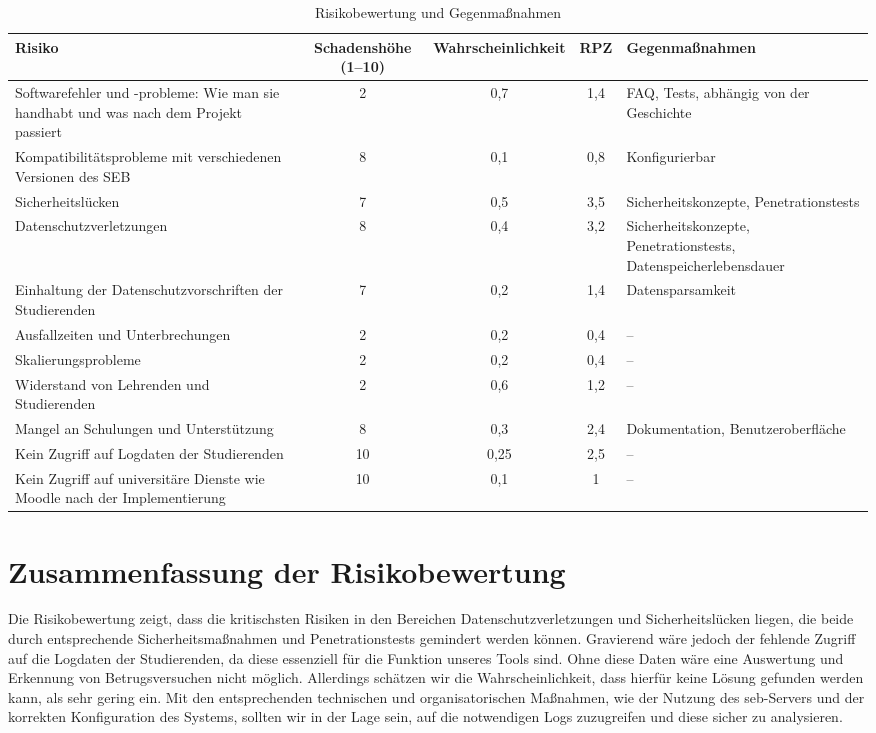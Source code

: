 \begin{landscape}
\begin{table}[htbp]
\centering
\begin{tabular}{|p{7cm}|c|c|c|p{6cm}|}
\hline
\textbf{Risiko} & \textbf{Schadenshöhe (1–10)} & \textbf{Wahrscheinlichkeit} & \textbf{RPZ} & \textbf{Gegenmaßnahmen} \\
\hline
Softwarefehler und -probleme: Wie man sie handhabt und was nach dem Projekt passiert & 2 & 0,7 & 1,4 & FAQ, Tests, abhängig von der Geschichte \\
\hline
Kompatibilitätsprobleme mit verschiedenen Versionen des SEB & 8 & 0,1 & 0,8 & Konfigurierbar \\
\hline
Sicherheitslücken & 7 & 0,5 & 3,5 & Sicherheitskonzepte, Penetrationstests \\
\hline
Datenschutzverletzungen & 8 & 0,4 & 3,2 & Sicherheitskonzepte, Penetrationstests, Datenspeicherlebensdauer \\
\hline
Einhaltung der Datenschutzvorschriften der Studierenden & 7 & 0,2 & 1,4 & Datensparsamkeit \\
\hline
Ausfallzeiten und Unterbrechungen & 2 & 0,2 & 0,4 & -- \\
\hline
Skalierungsprobleme & 2 & 0,2 & 0,4 & -- \\
\hline
Widerstand von Lehrenden und Studierenden & 2 & 0,6 & 1,2 & -- \\
\hline
Mangel an Schulungen und Unterstützung & 8 & 0,3 & 2,4 & Dokumentation, Benutzeroberfläche \\
\hline
Kein Zugriff auf Logdaten der Studierenden & 10 & 0,25 & 2,5 & -- \\
\hline
Kein Zugriff auf universitäre Dienste wie Moodle nach der Implementierung & 10 & 0,1 & 1 & -- \\
\hline
\end{tabular}
\caption{Risikobewertung und Gegenmaßnahmen}
\end{table}
\end{landscape}

\section{Zusammenfassung der Risikobewertung}

Die Risikobewertung zeigt, dass die kritischsten Risiken in den Bereichen Datenschutzverletzungen und Sicherheitslücken liegen, die beide durch entsprechende Sicherheitsmaßnahmen und Penetrationstests gemindert werden können. 
Gravierend wäre jedoch der fehlende Zugriff auf die Logdaten der Studierenden, da diese essenziell für die Funktion unseres Tools sind. 
Ohne diese Daten wäre eine Auswertung und Erkennung von Betrugsversuchen nicht möglich. 
Allerdings schätzen wir die Wahrscheinlichkeit, dass hierfür keine Lösung gefunden werden kann, als sehr gering ein. 
Mit den entsprechenden technischen und organisatorischen Maßnahmen, wie der Nutzung des \gls{seb}-Servers und der korrekten Konfiguration des Systems, sollten wir in der Lage sein, auf die notwendigen Logs zuzugreifen und diese sicher zu analysieren.
